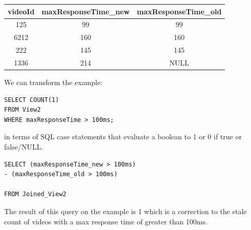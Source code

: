 \begin{tabular}{|c|c|c|}
\hline 
videoId & maxResponseTime\_new & maxResponseTime\_old \tabularnewline
\hline 
\hline 
125 & 99 & 99\tabularnewline
\hline 
6212 & 160 & 160\tabularnewline
\hline 
222 & 145 & 145\tabularnewline
\hline 
1336 & 214 & NULL\tabularnewline
\hline 
\end{tabular}

We can transform the example:

\begin{lstlisting}
SELECT COUNT(1) 
FROM View2 
WHERE maxResponseTime > 100ms;
\end{lstlisting}

in terms of SQL case statements that evaluate a boolean to 1 or 0 if true or false/NULL.
\begin{lstlisting}
SELECT (maxResponseTime_new > 100ms) 
- (maxResponseTime_old > 100ms)

FROM Joined_View2 
\end{lstlisting}
The result of this query on the example is 1 which is a correction to the stale count 
of videos with a max response time of greater than 100ms.

\fi
